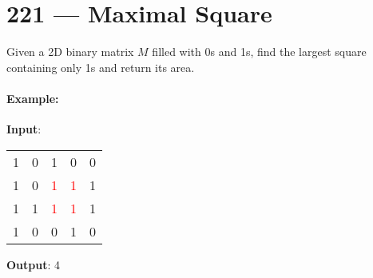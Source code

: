 \section{221 --- Maximal Square}
Given a 2D binary matrix $M$ filled with 0s and 1s, find the largest square containing only 1s and return its area.

\paragraph{Example:}

\begin{flushleft}
\textbf{Input}: 
\begin{table}[H]
\begin{tabular}{ccccc}
1 & 0 & 1 & 0 & 0 \\
1 & 0 & \textcolor{red}{1} & \textcolor{red}{1} & 1 \\
1 & 1 & \textcolor{red}{1} & \textcolor{red}{1} & 1 \\
1 & 0 & 0 & 1 & 0
\end{tabular}
\end{table}

\textbf{Output}: 4
\end{flushleft}